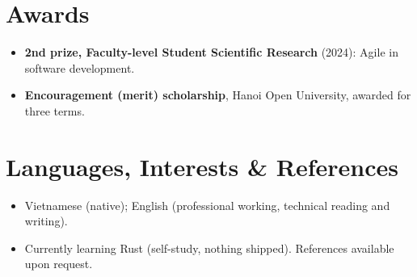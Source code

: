\documentclass[11pt,a4paper,sans]{moderncv}
\begin{document}

\section{Awards}
\vspace{1pt}
\begin{itemize}
\item \textbf{2nd prize, Faculty-level Student Scientific Research} (2024): Agile in software development.
\item \textbf{Encouragement (merit) scholarship}, Hanoi Open University, awarded for three terms.
\end{itemize}


%
\section{Languages, Interests \& References}
\vspace{1pt}
\begin{itemize}
\item Vietnamese (native); English (professional working, technical reading and writing).
\item Currently learning Rust (self-study, nothing shipped). References available upon request.
\end{itemize}
\end{document}
